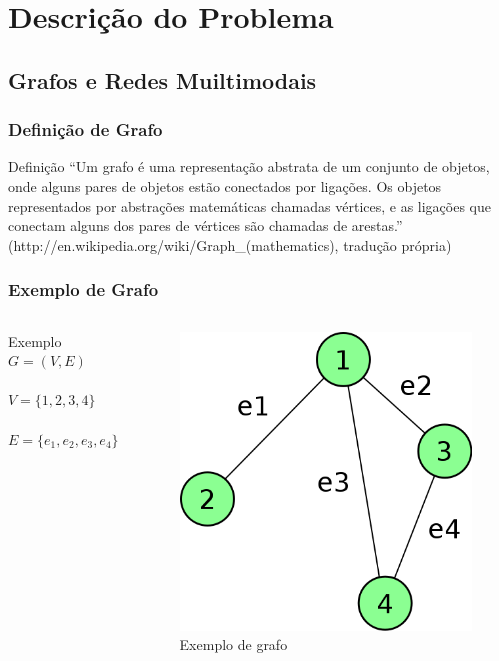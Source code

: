 \section{Descrição do Problema}

\subsection{Grafos e Redes Muiltimodais}

\frame
{
\frametitle{Definição de Grafo}
\begin{block}{Definição}
``Um grafo é uma representação abstrata de um conjunto de objetos, onde alguns pares de objetos estão conectados por ligações.
Os objetos representados por abstrações matemáticas chamadas vértices, e as ligações que conectam alguns dos pares de vértices são chamadas de arestas.''
(http://en.wikipedia.org/wiki/Graph\_(mathematics), tradução própria)
\end{block}
}

\frame
{
\frametitle{Exemplo de Grafo}
\begin{columns}[c]
\column{1.5in}
	\begin{exampleblock}{Exemplo}
		$G = (V,E)$ \\
		$ $ \\
		$V = \{1,2,3,4\}$ \\
		$ $ \\
		$E = \{e_1,e_2,e_3,e_4\}$ 
	\end{exampleblock}
\column{1.5in}
	\begin{figure}
		\includegraphics[width=\textwidth]{./imgs/grafo.png}
		\caption{Exemplo de grafo}
	\end{figure}
\end{columns}
}

